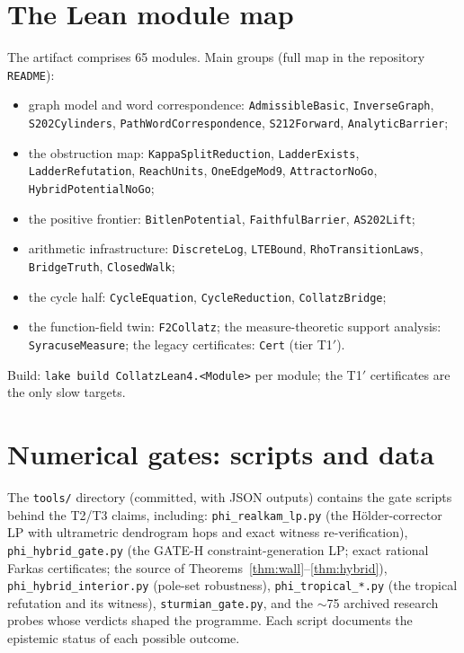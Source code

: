 \documentclass[11pt]{amsart}
\theoremstyle{definition}
\theoremstyle{remark}
\newcommand{\lean}[1]{{\def\_{\textunderscore\allowbreak}\texttt{#1}}}
\begin{document}
\section{The Lean module map}\label{app:modules}

The artifact comprises 65 modules.  Main groups (full map in the repository
\texttt{README}):
\begin{itemize}\sloppy
\item graph model and word correspondence: \lean{AdmissibleBasic},
  \lean{InverseGraph}, \lean{S202Cylinders}, \lean{PathWordCorrespondence},
  \lean{S212Forward}, \lean{AnalyticBarrier};
\item the obstruction map: \lean{KappaSplitReduction}, \lean{LadderExists},
  \lean{LadderRefutation}, \lean{ReachUnits}, \lean{OneEdgeMod9},
  \lean{AttractorNoGo}, \lean{HybridPotentialNoGo};
\item the positive frontier: \lean{BitlenPotential}, \lean{FaithfulBarrier},
  \lean{AS202Lift};
\item arithmetic infrastructure: \lean{DiscreteLog}, \lean{LTEBound},
  \lean{RhoTransitionLaws}, \lean{BridgeTruth}, \lean{ClosedWalk};
\item the cycle half: \lean{CycleEquation}, \lean{CycleReduction},
  \lean{CollatzBridge};
\item the function-field twin: \lean{F2Collatz}; the measure-theoretic
  support analysis: \lean{SyracuseMeasure}; the legacy certificates:
  \lean{Cert\_*} (tier T1$'$).
\end{itemize}
Build: \texttt{lake build CollatzLean4.<Module>} per module; the
T1$'$ certificates are the only slow targets.

\section{Numerical gates: scripts and data}\label{app:gates}

The \texttt{tools/} directory (committed, with JSON outputs) contains the
gate scripts behind the T2/T3 claims, including:
\texttt{phi\_realkam\_lp.py} (the Hölder-corrector LP with ultrametric
dendrogram hops and exact witness re-verification),
\texttt{phi\_hybrid\_gate.py} (the GATE-H constraint-generation LP; exact
rational Farkas certificates; the source of
Theorems~\ref{thm:wall}--\ref{thm:hybrid}),
\texttt{phi\_hybrid\_interior.py} (pole-set robustness),
\texttt{phi\_tropical\_*.py} (the tropical refutation and its witness),
\texttt{sturmian\_gate.py}, and the $\sim$75 archived research probes whose
verdicts shaped the programme.  Each script documents the epistemic status
of each possible outcome.
\end{document}
